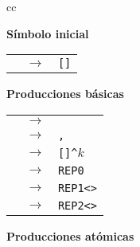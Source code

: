 \renewcommand{\thefigure}{PI.1}
\begin{figure}
\begin{center}
\begin{tabular}{cc}

    \begin{minipage}[t]{0.35\textwidth}
    {\bf Símbolo inicial}

    \medskip

    \begin{tabular}{rcl}
    \start & $\to$ & \verb#[#\inst\verb#]# %
    \end{tabular}

    \bigskip

    {\bf Producciones básicas}

    \medskip

    \begin{tabular}{rcl}
    \inst  & $\to$ & \atom %
    \\
    \inst  & $\to$ & \inst\verb#,#\inst %
    \\
    \inst  & $\to$ & \rep\verb#[#\inst\verb#]^#$k$%
    \\
    \rep  & $\to$ & \verb#REP0# %
    \\

    \rep  & $\to$ & \verb#REP1<#\atom\verb#># %
    \\
    \rep  & $\to$ & \verb#REP2<#\atom\verb#># %
    \\
    \end{tabular}
    \end{minipage}
    
    \begin{minipage}[t]{0.35\textwidth}

    {\bf Producciones atómicas}

    \medskip


\end{minipage}
\end{tabular}
\end{center}
\end{figure}
